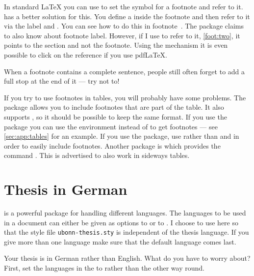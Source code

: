 In standard \LaTeX{} you can use 
to set the symbol for a footnote and refer to it.
\KOMAScript{} has a better solution for this.
You define a  inside the footnote and
then refer to it via the label and .
You can see how to do this in footnote~.
The  package claims to also know about footnote label.
However, if I use  to refer to it, \cref{foot:two},
it points to the section and not the footnote.
Using the  mechanism it is even
possible to click on the reference if you use pdf\LaTeX.

When a footnote contains a complete sentence, people still often
forget to add a full stop at the end of it --- try not to!

If you try to use footnotes in tables, you will probably have some
problems. The  package allows you to include footnotes
that are part of the table. It also supports , so it
should be possible to keep the same format. If you use the package
 you can use the environment  
instead of  to get footnotes
--- see \cref{sec:app:tables} for an example. 
If you use the  package, use 
rather than  and  in order to easily include
footnotes.
Another package is  which provides the command
. This is advertised to also work in sideways tables.


\section{Thesis in German}%
\label{sec:layout:german}

 is a powerful package for handling different
languages. The languages to be used in a document can either be given
as options to  or to . I choose to
use  here so that the style file
\texttt{ubonn-thesis.sty} is independent of the thesis language. If
you give more than one language make sure that the default language
comes last.

Your thesis is in German rather than English. What do you have to
worry about? First, set the languages in the  to
 rather than the other way round.

